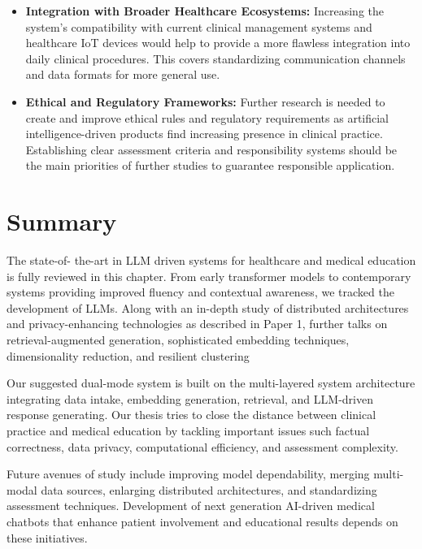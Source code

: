 \begin{itemize}[itemsep=2em]
    \item \textbf{Integration with Broader Healthcare Ecosystems:}  
          Increasing the system's compatibility with current clinical management systems and healthcare IoT devices would help to provide a more flawless integration into daily clinical procedures. This covers standardizing communication channels and data formats for more general use.
          
    \item \textbf{Ethical and Regulatory Frameworks:}  
          Further research is needed to create and improve ethical rules and regulatory requirements as artificial intelligence-driven products find increasing presence in clinical practice. Establishing clear assessment criteria and responsibility systems should be the main priorities of further studies to guarantee responsible application.

\end{itemize}


\section{Summary}
The state-of- the-art in LLM driven systems for healthcare and medical education is fully reviewed in this chapter. From early transformer models to contemporary systems providing improved fluency and contextual awareness, we tracked the development of LLMs. Along with an in-depth study of distributed architectures and privacy-enhancing technologies as described in Paper 1, further talks on retrieval-augmented generation, sophisticated embedding techniques, dimensionality reduction, and resilient clustering

Our suggested dual-mode system is built on the multi-layered system architecture integrating data intake, embedding generation, retrieval, and LLM-driven response generating. Our thesis tries to close the distance between clinical practice and medical education by tackling important issues such factual correctness, data privacy, computational efficiency, and assessment complexity. 

Future avenues of study include improving model dependability, merging multi-modal data sources, enlarging distributed architectures, and standardizing assessment techniques. Development of next generation AI-driven medical chatbots that enhance patient involvement and educational results depends on these initiatives.

\clearpage
